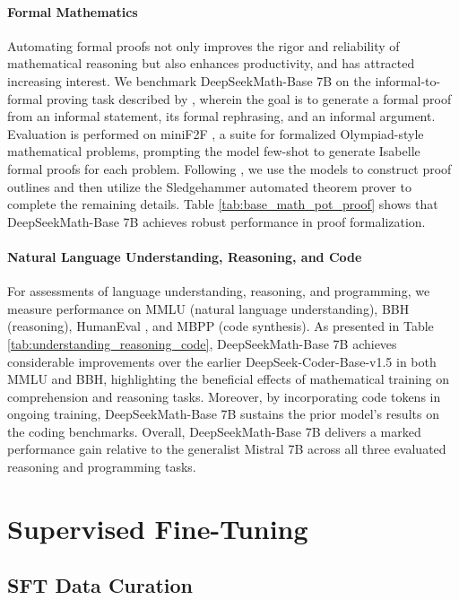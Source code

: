 \paragraph{Formal Mathematics}

Automating formal proofs not only improves the rigor and reliability of mathematical reasoning but also enhances productivity, and has attracted increasing interest. We benchmark DeepSeekMath-Base 7B on the informal-to-formal proving task described by \citep{dsp_proof}, wherein the goal is to generate a formal proof from an informal statement, its formal rephrasing, and an informal argument. Evaluation is performed on miniF2F \citep{minif2f}, a suite for formalized Olympiad-style mathematical problems, prompting the model few-shot to generate Isabelle formal proofs for each problem. Following \cite{dsp_proof}, we use the models to construct proof outlines and then utilize the Sledgehammer automated theorem prover \citep{sledgehammer} to complete the remaining details. Table \ref{tab:base_math_pot_proof} shows that DeepSeekMath-Base 7B achieves robust performance in proof formalization.

\paragraph{Natural Language Understanding, Reasoning, and Code}

For assessments of language understanding, reasoning, and programming, we measure performance on MMLU \citep{mmlu} (natural language understanding), BBH \citep{bbh} (reasoning), HumanEval \citep{codex}, and MBPP \citep{mbpp} (code synthesis). As presented in Table \ref{tab:understanding_reasoning_code}, DeepSeekMath-Base 7B achieves considerable improvements over the earlier DeepSeek-Coder-Base-v1.5 \citep{deepseek-coder} in both MMLU and BBH, highlighting the beneficial effects of mathematical training on comprehension and reasoning tasks. Moreover, by incorporating code tokens in ongoing training, DeepSeekMath-Base 7B sustains the prior model’s results on the coding benchmarks. Overall, DeepSeekMath-Base 7B delivers a marked performance gain relative to the generalist Mistral 7B \citep{mistral} across all three evaluated reasoning and programming tasks.

\section{Supervised Fine-Tuning}

\subsection{SFT Data Curation}

